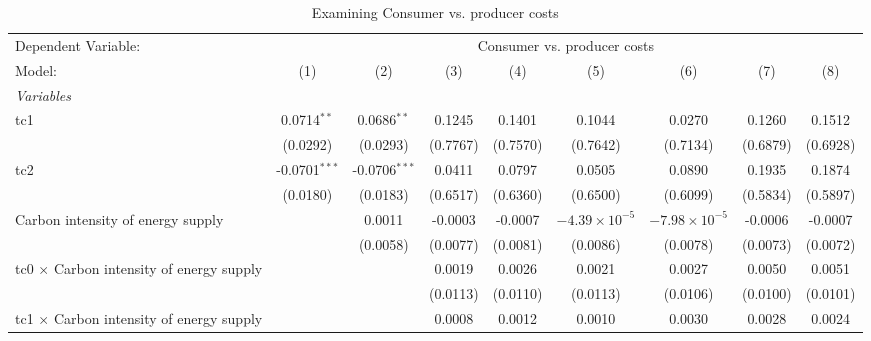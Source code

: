 
\begin{table}[htbp]
   \caption{Examining Consumer vs. producer costs}
   \centering
   \begin{tabular}{lcccccccc}
      \tabularnewline \midrule \midrule
      Dependent Variable: & \multicolumn{8}{c}{Consumer vs. producer costs}\\
      Model:                                          & (1)             & (2)             & (3)      & (4)      & (5)                    & (6)                    & (7)      & (8)\\  
      \midrule
      \emph{Variables}\\
      tc1                                             & 0.0714$^{**}$   & 0.0686$^{**}$   & 0.1245   & 0.1401   & 0.1044                 & 0.0270                 & 0.1260   & 0.1512\\   
                                                      & (0.0292)        & (0.0293)        & (0.7767) & (0.7570) & (0.7642)               & (0.7134)               & (0.6879) & (0.6928)\\   
      tc2                                             & -0.0701$^{***}$ & -0.0706$^{***}$ & 0.0411   & 0.0797   & 0.0505                 & 0.0890                 & 0.1935   & 0.1874\\   
                                                      & (0.0180)        & (0.0183)        & (0.6517) & (0.6360) & (0.6500)               & (0.6099)               & (0.5834) & (0.5897)\\   
      Carbon intensity of energy supply               &                 & 0.0011          & -0.0003  & -0.0007  & $-4.39\times 10^{-5}$  & $-7.98\times 10^{-5}$  & -0.0006  & -0.0007\\   
                                                      &                 & (0.0058)        & (0.0077) & (0.0081) & (0.0086)               & (0.0078)               & (0.0073) & (0.0072)\\   
      tc0 $\times$ Carbon intensity of energy supply  &                 &                 & 0.0019   & 0.0026   & 0.0021                 & 0.0027                 & 0.0050   & 0.0051\\   
                                                      &                 &                 & (0.0113) & (0.0110) & (0.0113)               & (0.0106)               & (0.0100) & (0.0101)\\   
      tc1 $\times$ Carbon intensity of energy supply  &                 &                 & 0.0008   & 0.0012   & 0.0010                 & 0.0030                 & 0.0028   & 0.0024\\   

\end{tabular}
\end{table}
